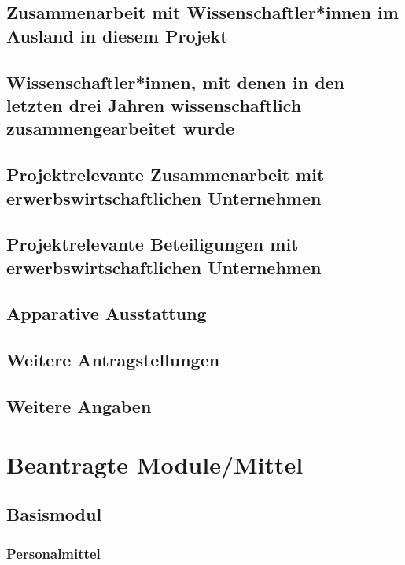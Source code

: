 \documentclass[de]{dfg-proposal}
\begin{document}
\subsection{Zusammenarbeit mit Wissenschaftler*innen im Ausland in diesem Projekt}

\subsection{Wissenschaftler*innen, mit denen in den letzten drei Jahren wissenschaftlich zusammengearbeitet wurde}

\subsection{Projektrelevante Zusammenarbeit mit erwerbswirtschaftlichen Unternehmen}

\subsection{Projektrelevante Beteiligungen mit erwerbswirtschaftlichen Unternehmen}

\subsection{Apparative Ausstattung}

\subsection{Weitere Antragstellungen}

\subsection{Weitere Angaben}

\section{Beantragte Module/Mittel}\label{sec:beantragte-module/mittel}

\subsection{Basismodul}

\subsubsection{Personalmittel}
\end{document}
